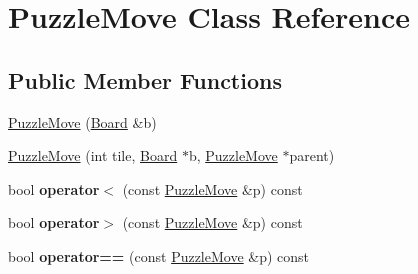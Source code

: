 \hypertarget{classPuzzleMove}{\section{\-Puzzle\-Move \-Class \-Reference}
\label{classPuzzleMove}
}
\subsection*{\-Public \-Member \-Functions}
\begin{DoxyCompactItemize}
\item 
\hyperlink{classPuzzleMove_aab82684bd0bec53818b36ff1d38cd918}{\-Puzzle\-Move} (\hyperlink{classBoard}{\-Board} \&b)
\item 
\hyperlink{classPuzzleMove_a648f58dc747438872988d888b1b91c35}{\-Puzzle\-Move} (int tile, \hyperlink{classBoard}{\-Board} $\ast$b, \hyperlink{classPuzzleMove}{\-Puzzle\-Move} $\ast$parent)
\item 
\hypertarget{classPuzzleMove_a3b76cc463e70c40feed64915363c3dd9}{bool {\bfseries operator$<$} (const \hyperlink{classPuzzleMove}{\-Puzzle\-Move} \&p) const }\label{classPuzzleMove_a3b76cc463e70c40feed64915363c3dd9}

\item 
\hypertarget{classPuzzleMove_acdbbc19713741a1adf74e6886b52a6d7}{bool {\bfseries operator$>$} (const \hyperlink{classPuzzleMove}{\-Puzzle\-Move} \&p) const }\label{classPuzzleMove_acdbbc19713741a1adf74e6886b52a6d7}

\item 
\hypertarget{classPuzzleMove_abd3fe605a9546d8ff7cc4609cef69761}{bool {\bfseries operator==} (const \hyperlink{classPuzzleMove}{\-Puzzle\-Move} \&p) const }\label{classPuzzleMove_abd3fe605a9546d8ff7cc4609cef69761}

\end{DoxyCompactItemize}

